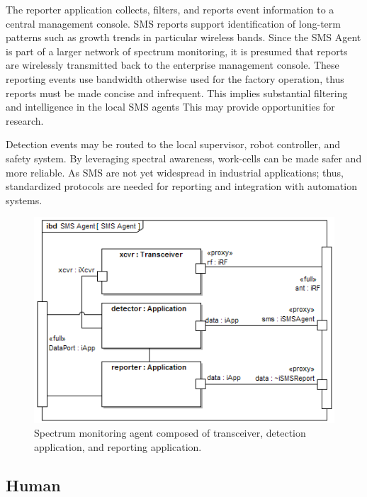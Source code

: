 The reporter application collects, filters, and reports event information to a central management console.  SMS reports support identification of long-term patterns such as growth trends in particular wireless bands.  Since the SMS Agent is part of a larger network of spectrum monitoring, it is presumed that reports are wirelessly transmitted back to the enterprise management console.  These reporting events use bandwidth otherwise used for the factory operation, thus reports must be made concise and infrequent.  This implies substantial filtering and intelligence in the local SMS agents This may provide opportunities for research.

Detection events may be routed to the local supervisor, robot controller, and safety system.  By leveraging spectral awareness, work-cells can be made safer and more reliable.  As SMS are not yet widespread in industrial applications; thus, standardized protocols are needed for reporting and integration with automation systems.

\begin{figure}[tbp]
	\centering
	\includegraphics[width=0.99\columnwidth]{./chapter-sysml/diagrams/ibd__SMS_Agent__SMS_Agent}
	\caption{Spectrum monitoring agent composed of transceiver, detection application, and reporting application.}
	\label{sysml:fig:sms:bdd}
\end{figure}

\subsection{Human}\label{sysml:sec:human}

